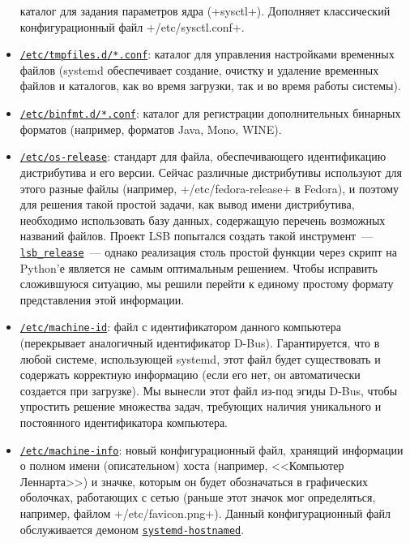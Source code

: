 \documentclass[10pt,oneside,a4paper]{article}
\newcommand{\hreftt}[2]{\href{#1}{\texttt{#2}}}
\begin{document}
\begin{itemize}
		каталог для задания параметров ядра (+sysctl+). Дополняет
		классический конфигурационный файл +/etc/sysctl.conf+.
	\item
		\hreftt{http://0pointer.de/public/systemd-man/tmpfiles.d.html}{/etc/tmpfiles.d/*.conf}:
		каталог для управления настройками временных файлов (systemd
		обеспечивает создание, очистку и удаление временных файлов и
		каталогов, как во время загрузки, так и во время работы
		системы).
	\item
		\hreftt{http://0pointer.de/public/systemd-man/binfmt.d.html}{/etc/binfmt.d/*.conf}:
		каталог для регистрации дополнительных бинарных форматов
		(например, форматов Java, Mono, WINE).
	\item
		\hreftt{http://0pointer.de/public/systemd-man/os-release.html}{/etc/os-release}:
		стандарт для файла, обеспечивающего идентификацию дистрибутива и
		его версии. Сейчас различные дистрибутивы используют для этого
		разные файлы (например, +/etc/fedora-release+ в Fedora), и
		поэтому для решения такой простой задачи, как вывод имени
		дистрибутива, необходимо использовать базу данных, содержащую
		перечень возможных названий файлов. Проект LSB попытался создать
		такой инструмент~---
		\hreftt{http://refspecs.freestandards.org/LSB_3.1.0/LSB-Core-generic/LSB-Core-generic/lsbrelease.html}{lsb\_release}~---
		однако реализация столь простой функции через скрипт на Python'е
		является не~самым оптимальным решением. Чтобы исправить
		сложившуюся ситуацию, мы решили перейти к единому простому
		формату представления этой информации.
	\item
		\hreftt{http://0pointer.de/public/systemd-man/machine-id.html}{/etc/machine-id}:
		файл с идентификатором данного компьютера (перекрывает
		аналогичный идентификатор D-Bus). Гарантируется, что в любой
		системе, использующей systemd, этот файл будет существовать и
		содержать корректную информацию (если его нет, он автоматически
		создается при загрузке). Мы вынесли этот файл из-под эгиды
		D-Bus, чтобы упростить решение множества задач, требующих
		наличия уникального и постоянного идентификатора компьютера.
	\item
		\hreftt{http://0pointer.de/public/systemd-man/machine-info.html}{/etc/machine-info}:
		новый конфигурационный файл, хранящий информации о полном имени
		(описательном) хоста (например, <<Компьютер Леннарта>>) и
		значке, которым он будет обозначаться в графических оболочках,
		работающих с сетью (раньше этот значок мог определяться,
		например, файлом +/etc/favicon.png+). Данный конфигурационный
		файл обслуживается демоном
		\hreftt{http://www.freedesktop.org/wiki/Software/systemd/hostnamed}{systemd-hostnamed}.
\end{itemize}
\end{document}
